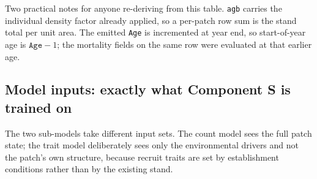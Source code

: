 \documentclass[11pt]{article}
\begin{document}
Two practical notes for anyone re-deriving from this table. \texttt{agb} carries the individual density factor already applied, so a per-patch row sum is the stand total per unit area. The emitted \texttt{Age} is incremented at year end, so start-of-year age is $\texttt{Age}-1$; the mortality fields on the same row were evaluated at that earlier age.

\subsection{Model inputs: exactly what Component S is trained on}
\label{sec:inputs}

The two sub-models take different input sets. The count model sees the full patch state; the trait model deliberately sees only the environmental drivers and not the patch's own structure, because recruit traits are set by establishment conditions rather than by the existing stand.
\end{document}
